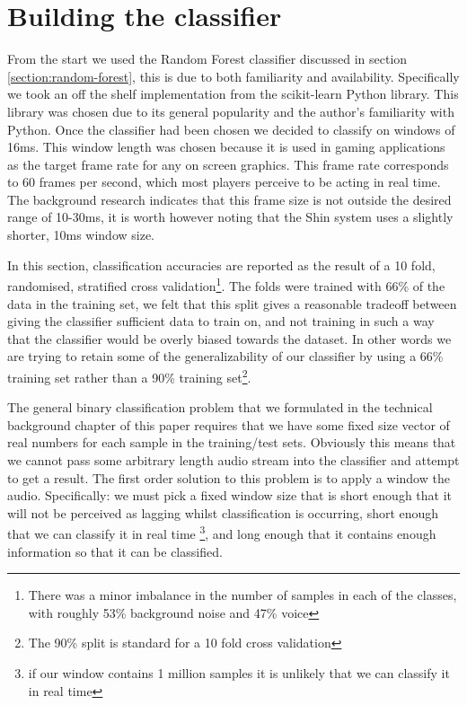 \documentclass[ %
                    author={Sam Phippen},
                supervisor={Dr. Rafal Bogacz},
                     title={Real time voice activity detectors in noisy personal computing environments},
                  subtitle={},
                    degree={MEng},
                      year={2012} ]{thesis}
\begin{document}
\section{Building the classifier}

From the start we used the Random Forest classifier discussed in section
\ref{section:random-forest}, this is due to both familiarity and availability.
Specifically we took an off the shelf implementation from the
scikit-learn\cite{sklearn} Python library. This library was chosen due to its
general popularity and the author's familiarity with Python. Once the
classifier had been chosen we decided to classify on windows of 16ms. This
window length was chosen because it is used in gaming applications as the
target frame rate for any on screen graphics. This frame rate corresponds to 60
frames per second, which most players perceive to be acting in real time. The
background research indicates that this frame size is not outside the desired
range of 10-30ms, it is worth however noting that the Shin\cite{shin} system
uses a slightly shorter, 10ms window size.

In this section, classification accuracies are reported as the result of a 10
fold, randomised, stratified cross validation\footnote{There was a minor
    imbalance in the number of samples in each of the classes, with roughly
    53\% background noise and 47\% voice}.  The folds were trained with 66\% of
    the data in the training set, we felt that this split gives a reasonable
    tradeoff between giving the classifier sufficient data to train on, and not
    training in such a way that the classifier would be overly biased towards
    the dataset. In other words we are trying to retain some of the
    generalizability of our classifier by using a 66\% training set rather than
    a 90\% training set\footnote{The 90\% split is standard for a 10 fold cross
validation}.

The general binary classification problem that we formulated in the technical
background chapter of this paper requires that we have some fixed size vector
of real numbers for each sample in the training/test sets. Obviously this means
that we cannot pass some arbitrary length audio stream into the classifier and
attempt to get a result. The first order solution to this problem is to apply a
window the audio. Specifically: we must pick a fixed window size that is short
enough that it will not be perceived as lagging whilst classification is
occurring, short enough that we can classify it in real time \footnote{if our
window contains 1 million samples it is unlikely that we can classify it in
real time}, and long enough that it contains enough information so that it can
be classified.
\end{document}
